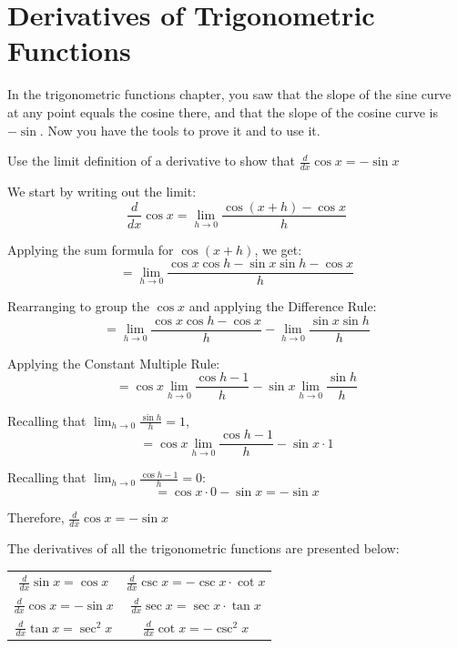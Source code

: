 \section{Derivatives of Trigonometric Functions}

In the trigonometric functions chapter, you saw that the slope of the sine
curve at any point equals the cosine there, and that the slope of the cosine
curve is $-\sin$. Now you have the tools to prove it and to use it.

\begin{Exercise}
    [title=Derivative of cosine, label=trigderiv1]
    Use the limit definition of a derivative to show that $\frac{d}{dx} \cos{x} 
    = -\sin{x}$
\end{Exercise}
\begin{Answer}
    [ref=trigderiv1]
    We start by writing out the limit: 
    $$\frac{d}{dx}\cos{x}=\lim_{h \to 0}\frac{\cos(x+h)-\cos{x}}{h}$$

    Applying the sum formula for $\cos(x+h)$, we get:
    $$=\lim_{h \to 0}\frac{\cos{x}\cos{h}-\sin{x}\sin{h}-\cos{x}}{h}$$

    Rearranging to group the $\cos{x}$ and applying the Difference Rule:
    $$=\lim_{h \to 0}\frac{\cos{x}\cos{h}-\cos{x}}{h} - \lim_{h \to 0}\frac{\sin{x}\sin{h}}{h}$$

    Applying the Constant Multiple Rule:
    $$=\cos{x}\lim_{h \to 0}\frac{\cos{h}-1}{h} - \sin{x}\lim_{h \to 0}\frac{\sin{h}}{h}$$

    Recalling that $\lim_{h \to 0}\frac{\sin{h}}{h} = 1$,
    $$=\cos{x}\lim_{h \to 0}\frac{\cos{h}-1}{h}-\sin{x} \cdot 1$$

    Recalling that $\lim_{h \to 0}\frac{\cos{h}-1}{h}=0$:
    $$=\cos{x} \cdot0 -\sin{x} = -\sin{x}$$

    Therefore, $\frac{d}{dx}\cos{x}=-\sin{x}$
\end{Answer}

The derivatives of all the trigonometric functions are presented below:
\begin{center}
\begin{tabular}{ |c|c| } 
 \hline
 $\frac{d}{dx}\sin{x}=\cos{x}$ & $\frac{d}{dx}\csc{x}=-\csc{x} \cdot \cot{x}$ \\ 
 $\frac{d}{dx}\cos{x}=-\sin{x}$ & $\frac{d}{dx}\sec{x}= \sec{x} \cdot \tan{x}$  \\ 
 $\frac{d}{dx}\tan{x}=\sec^2{x}$ & $\frac{d}{dx}\cot{x}=-\csc^2{x}$  \\ 
 \hline
\end{tabular}
\end{center}

